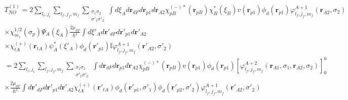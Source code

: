 \documentclass[a4paper,11pt]{book}
\numberwithin{equation}{section}
\numberwithin{figure}{section}
\numberwithin{table}{section}
\begin{document}
\begin{multline*}
T^{(1)}_{NO}=2\sum_{l_i,j_i}\sum_{l_f,j_f,m_f}\sum_{\substack{\sigma_1 \sigma_2\\\sigma'_1 \sigma'_2}}
\int d\xi_A d\mathbf{r}_{dF}d\mathbf{r}_{p1}d\mathbf{r}_{A2}
\chi^{(-)*}_{pB}(\mathbf{r}_{pB})\chi_B^*(\xi_B) v(\mathbf{r}_{p1})\phi_d(\mathbf r_{p1})\varphi^{A+1}_{l_f,j_f,m_f}(\mathbf r_{A2},\sigma_2)
\\
 \times \chi^{1/2}_{m_s}(\sigma_p)\Psi_A(\xi_A) \frac{2\mu_{dF}}{\hbar^2} \int  d\xi'_A d\mathbf{r}'_{dF}d\mathbf{r}'_{p1}d\mathbf{r}'_{A2}\\
 \times \chi^{(+)}_{tA}(\mathbf{r}_{tA})\psi_A^*(\xi'_A) \phi_d(\mathbf r'_{p1})\mathbb I \varphi^{A+1}_{l_f,j_f,m_f}(\mathbf r'_{A2},\sigma'_2)\\
 =2\sum_{l_i,j_i}\sum_{l_f,j_f,m_f}\sum_{\substack{\sigma_1 \sigma_2\\\sigma'_1 \sigma'_2}}
 \int d\mathbf{r}_{dF}d\mathbf{r}_{p1}d\mathbf{r}_{A2}
 \chi^{(-)*}_{pB}(\mathbf{r}_{pB}) v(\mathbf{r}_{p1})\phi_d(\mathbf r_{p1})\left[\varphi^{A+2}_{l_f,j_f,m_f}(\mathbf r_{A1},\sigma_1,\mathbf r_{A2},\sigma_2)\right]^0_0
 \\
  \times  \frac{2\mu_{dF}}{\hbar^2} \int   d\mathbf{r}'_{dF}d\mathbf{r}'_{p1}d\mathbf{r}'_{A2} \chi^{(+)}_{tA}(\mathbf{r}'_{tA}) \phi_d(\mathbf r'_{p1},\sigma'_1)\phi_d(\mathbf r'_{p2},\sigma'_2)\varphi^{A+1}_{l_f,j_f,m_f}(\mathbf r'_{A2},\sigma'_2)  
\end{multline*} 
















 
\end{document}
